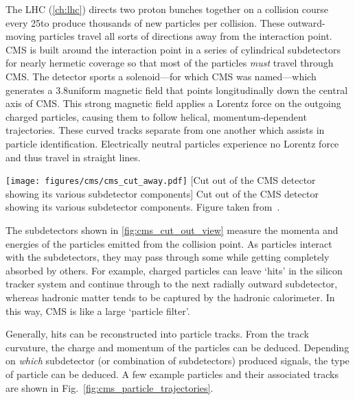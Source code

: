 The LHC (\cref{ch:lhc}) directs two proton bunches together on a collision course every 25\ns to produce thousands of new particles per \pp collision.
These outward-moving particles travel all sorts of directions away from the interaction point.
CMS is built around the interaction point in a series of cylindrical subdetectors for nearly hermetic coverage so that most of the particles \emph{must} travel through CMS.
The detector sports a solenoid---for which CMS was named---which generates a 3.8\tesla uniform magnetic field that points longitudinally down the central axis of CMS.
This strong magnetic field applies a Lorentz force on the outgoing charged particles, causing them to follow helical, momentum-dependent trajectories.
These curved tracks separate from one another which assists in particle identification.
Electrically neutral particles experience no Lorentz force and thus travel in straight lines.
\begin{multiFigure}
    \centering
        \texttt{[image: figures/cms/cms\_cut\_away.pdf]}
        [Cut out of the CMS detector showing its various subdetector components]
        {Cut out of the CMS detector showing its various subdetector components.
        Figure taken from~\cite{cms_cut_away}.}
    \label{fig:cms_cut_out_view}
\end{multiFigure}

The subdetectors shown in \cref{fig:cms_cut_out_view} measure the momenta and energies of the particles emitted from the \pp collision point.
As particles interact with the subdetectors, they may pass through some while getting completely absorbed by others.
For example, charged particles can leave `hits' in the silicon tracker system and continue through to the next radially outward subdetector, whereas hadronic matter tends to be captured by the hadronic calorimeter.
In this way, CMS is like a large `particle filter'.

Generally, hits can be reconstructed into particle tracks.
From the track curvature, the charge and momentum of the particles can be deduced.
Depending on \emph{which} subdetector (or combination of subdetectors) produced signals, the type of particle can be deduced.
A few example particles and their associated tracks are shown in Fig.~\ref{fig:cms_particle_trajectories}.

